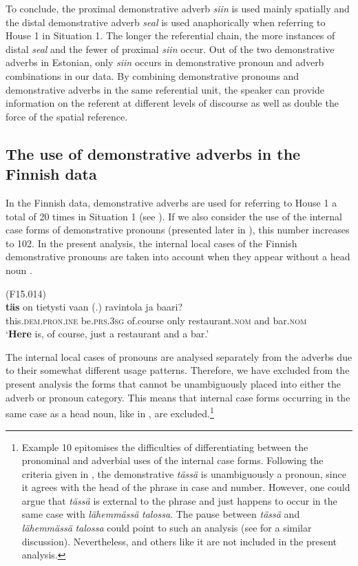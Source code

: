 \documentclass[output=paper,colorlinks,citecolor=brown]{langscibook}
\begin{document}
To conclude, the proximal demonstrative adverb \textit{siin} is used mainly spatially and the distal demonstrative adverb \textit{seal} is used anaphorically when referring to House 1 in Situation 1. The longer the referential chain, the more instances of distal \textit{seal} and the fewer of proximal \textit{siin} occur. Out of the two demonstrative adverbs in Estonian, only \textit{siin} occurs in demonstrative pronoun and adverb combinations in our data. By combining demonstrative pronouns and demonstrative adverbs in the same referential unit, the speaker can provide information on the referent at different levels of discourse as well as double the force of the spatial reference.

\subsection{The use of demonstrative adverbs in the Finnish data}\label{sec:nahkola:4.3}

In the Finnish data, demonstrative adverbs are used for referring to House 1 a total of 20 times in Situation 1 (see ). If we also consider the use of the internal case forms of demonstrative pronouns (presented later in ), this number increases to 102. In the present analysis, the internal local cases of the Finnish demonstrative pronouns are taken into account when they appear without a head noun .

\ea\label{ex:nahkola:9} (F15.014)\\
\gll \textbf{täs} on tietysti vaan (.) ravintola ja baari?\\
     this.\textsc{dem.pron.ine} be.\textsc{prs.3sg} of.course only {} restaurant.\textsc{nom} and bar.\textsc{nom}\\
\glt ‘\textbf{Here} is, of course, just a restaurant and a bar.’ 
\z

The internal local cases of pronouns are analysed separately from the adverbs due to their somewhat different usage patterns. Therefore, we have excluded from the present analysis the forms that cannot be unambiguously placed into either the adverb or pronoun category. This means that internal case forms occurring in the same case as a head noun, like in , are excluded.\footnote{Example 10 epitomises the difficulties of differentiating between the pronominal and adverbial uses of the internal case forms. Following the criteria given in , the demonstrative \textit{tässä} is unambiguously a pronoun, since it agrees with the head of the phrase in case and number. However, one could argue that \textit{tässä} is external to the phrase and just happens to occur in the same case with \textit{lähemmässä} \textit{talossa}. The pause between \textit{tässä} and \textit{lähemmässä} \textit{talossa} could point to such an analysis (see \citealt[86]{Laury1996} for a similar discussion). Nevertheless,  and others like it are not included in the present analysis.}
\end{document}
